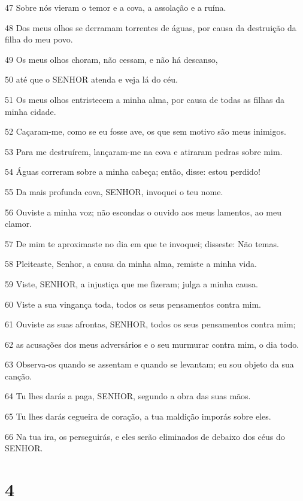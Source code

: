 \par 47 Sobre nós vieram o temor e a cova, a assolação e a ruína.
\par 48 Dos meus olhos se derramam torrentes de águas, por causa da destruição da filha do meu povo.
\par 49 Os meus olhos choram, não cessam, e não há descanso,
\par 50 até que o SENHOR atenda e veja lá do céu.
\par 51 Os meus olhos entristecem a minha alma, por causa de todas as filhas da minha cidade.
\par 52 Caçaram-me, como se eu fosse ave, os que sem motivo são meus inimigos.
\par 53 Para me destruírem, lançaram-me na cova e atiraram pedras sobre mim.
\par 54 Águas correram sobre a minha cabeça; então, disse: estou perdido!
\par 55 Da mais profunda cova, SENHOR, invoquei o teu nome.
\par 56 Ouviste a minha voz; não escondas o ouvido aos meus lamentos, ao meu clamor.
\par 57 De mim te aproximaste no dia em que te invoquei; disseste: Não temas.
\par 58 Pleiteaste, Senhor, a causa da minha alma, remiste a minha vida.
\par 59 Viste, SENHOR, a injustiça que me fizeram; julga a minha causa.
\par 60 Viste a sua vingança toda, todos os seus pensamentos contra mim.
\par 61 Ouviste as suas afrontas, SENHOR, todos os seus pensamentos contra mim;
\par 62 as acusações dos meus adversários e o seu murmurar contra mim, o dia todo.
\par 63 Observa-os quando se assentam e quando se levantam; eu sou objeto da sua canção.
\par 64 Tu lhes darás a paga, SENHOR, segundo a obra das suas mãos.
\par 65 Tu lhes darás cegueira de coração, a tua maldição imporás sobre eles.
\par 66 Na tua ira, os perseguirás, e eles serão eliminados de debaixo dos céus do SENHOR.

\chapter{4}

